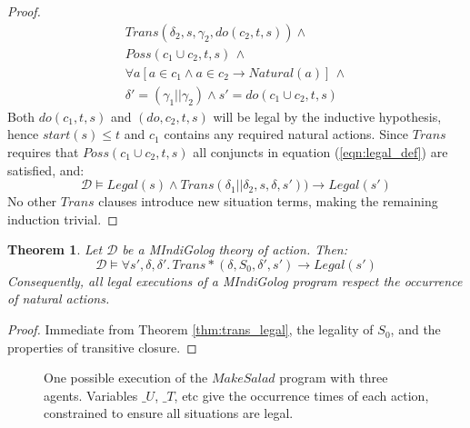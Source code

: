 \documentclass[letterpaper]{article}
\newtheorem{theorem}{Theorem}
\begin{document}
\begin{proof}
\begin{multline*}
Trans(\delta_{2},s,\gamma_{2},do(c_{2},t,s))\wedge\\
Poss(c_{1}\cup c_{2},t,s)\,\wedge\\
\forall a\left[a\in c_{1}\wedge a\in c_{2}\rightarrow Natural(a)\right]\,\wedge\\
\delta'=(\gamma_{1}||\gamma_{2})\wedge s'=do(c_{1}\cup c_{2},t,s)
\end{multline*}
Both $do(c_1,t,s)$ and $(do,c_2,t,s)$ will be legal by the inductive hypothesis,
hence $start(s) \leq t$ and $c_1$ contains any required natural actions.
Since $Trans$ requires that $Poss(c_1 \cup c_2,t,s)$ all conjuncts in
equation (\ref{eqn:legal_def}) are satisfied, and:
\begin{equation*}
\mathcal{D} \models Legal(s) \wedge Trans(\delta_1 || \delta_2,s,\delta,s'))
\rightarrow Legal(s')
\end{equation*}
No other $Trans$ clauses introduce new situation terms, making
the remaining induction trivial.
\end{proof}

\begin{theorem}
Let $\mathcal{D}$ be a MIndiGolog theory of action. Then:
\begin{equation*}
\mathcal{D} \models \forall s',\delta,\delta'.\,Trans*(\delta,S_0,\delta',s')
\rightarrow Legal(s')
\end{equation*}
Consequently, all legal executions of a MIndiGolog program respect
the occurrence of natural actions.
\end{theorem}

\begin{proof}
Immediate from Theorem \ref{thm:trans_legal}, the legality of $S_0$, and
the properties of transitive closure.
\end{proof}

\begin{figure*}[t]
\centering
{}
\caption{One possible execution of the $MakeSalad$
program with three agents. Variables $\_ U$, $\_ T$, etc give
the occurrence times of each action, constrained to ensure all situations
are legal.}\label{cap:example_trace}
\end{figure*}
\end{document}
